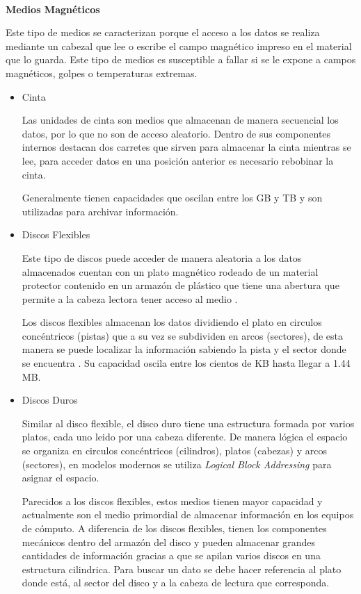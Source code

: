 \textbf{\\ Medios Magn\'{e}ticos \\}

Este tipo de medios se caracterizan porque el acceso a los datos se realiza mediante un cabezal que lee o escribe el campo magn\'{e}tico impreso en el material que lo guarda. Este tipo de medios es susceptible a fallar si se le expone a campos magn\'{e}ticos, golpes o temperaturas extremas.

\begin{itemize}
  \item Cinta
  
  Las unidades de cinta son medios que almacenan de manera secuencial los datos, por lo que no son de acceso aleatorio. Dentro de sus componentes internos destacan dos carretes que sirven para almacenar la cinta mientras se lee, para acceder datos en una posici\'{o}n anterior es necesario rebobinar la cinta.
  
  Generalmente tienen capacidades que oscilan entre los GB y TB  \cite{b306cc575a86d1e84e6ba100dcfb4417} y son utilizadas para archivar informaci\'{o}n.
  
  \item Discos Flexibles
  
  Este tipo de discos puede acceder de manera aleatoria a los datos almacenados cuentan con un plato magn\'{e}tico rodeado de un material protector contenido en un armaz\'{o}n de pl\'{a}stico que tiene una abertura que permite a la cabeza lectora tener acceso al medio \cite{09678f37a2afcca35133d9a7306744b4}.
  
  Los discos flexibles almacenan los datos dividiendo el plato en circulos conc\'{e}ntricos (pistas) que a su vez se subdividen en arcos (sectores), de esta manera se puede localizar la informaci\'{o}n sabiendo la pista y el sector donde se encuentra \cite{04667739f34ceed8672133b51ada8a35}. Su capacidad oscila entre los cientos de KB hasta llegar a 1.44 MB.
  
  \item Discos Duros
  
  Similar al disco flexible, el disco duro tiene una estructura formada por varios platos, cada uno leido por una cabeza diferente. De manera l\'{o}gica el espacio se organiza en circulos conc\'{e}ntricos (cilindros), platos (cabezas) y arcos (sectores), en modelos modernos se utiliza \emph{Logical Block Addressing} para asignar el espacio.
  
  Parecidos a los discos flexibles, estos medios tienen mayor capacidad y actualmente son el medio primordial de almacenar informaci\'{o}n en los equipos de c\'{o}mputo. A diferencia de los discos flexibles, tienen los componentes mec\'{a}nicos dentro del armaz\'{o}n del disco y pueden almacenar grandes cantidades de informaci\'{o}n gracias a que se apilan varios discos en una estructura cilindrica. Para buscar un dato se debe hacer referencia al plato donde est\'{a}, al sector del disco y a la cabeza de lectura que corresponda.
  
\end{itemize}

